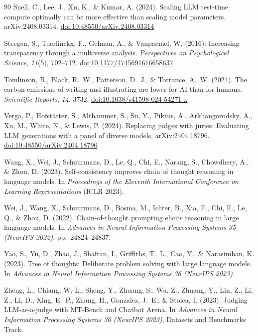\documentclass[12pt,a4paper]{article}
\begin{document}
\begin{thebibliography}{99}
Snell, C., Lee, J., Xu, K., \& Kumar, A. (2024).
Scaling LLM test-time compute optimally can be more effective than scaling model
  parameters.
arXiv:2408.03314.
\href{https://doi.org/10.48550/arXiv.2408.03314}{doi:10.48550/arXiv.2408.03314}

Steegen, S., Tuerlinckx, F., Gelman, A., \& Vanpaemel, W. (2016).
Increasing transparency through a multiverse analysis.
\textit{Perspectives on Psychological Science}, \textit{11}(5), 702--712.
\href{https://doi.org/10.1177/1745691616658637}{doi:10.1177/1745691616658637}

Tomlinson, B., Black, R.~W., Patterson, D.~J., \& Torrance, A.~W. (2024).
The carbon emissions of writing and illustrating are lower for AI than for
  humans.
\textit{Scientific Reports}, \textit{14}, 3732.
\href{https://doi.org/10.1038/s41598-024-54271-x}{doi:10.1038/s41598-024-54271-x}

Verga, P., Hofst\"atter, S., Althammer, S., Su, Y., Piktus, A.,
  Arkhangorodsky, A., Xu, M., White, N., \& Lewis, P. (2024).
Replacing judges with juries: Evaluating LLM generations with a panel of diverse
  models.
arXiv:2404.18796.
\href{https://doi.org/10.48550/arXiv.2404.18796}{doi:10.48550/arXiv.2404.18796}

Wang, X., Wei, J., Schuurmans, D., Le, Q., Chi, E., Narang, S., Chowdhery, A.,
  \& Zhou, D. (2023).
Self-consistency improves chain of thought reasoning in language models.
In \textit{Proceedings of the Eleventh International Conference on Learning
  Representations} (ICLR 2023).

Wei, J., Wang, X., Schuurmans, D., Bosma, M., Ichter, B., Xia, F., Chi, E.,
  Le, Q., \& Zhou, D. (2022).
Chain-of-thought prompting elicits reasoning in large language models.
In \textit{Advances in Neural Information Processing Systems 35 (NeurIPS 2022)},
  pp.~24824--24837.

Yao, S., Yu, D., Zhao, J., Shafran, I., Griffiths, T.~L., Cao, Y., \&
  Narasimhan, K. (2023).
Tree of thoughts: Deliberate problem solving with large language models.
In \textit{Advances in Neural Information Processing Systems 36 (NeurIPS 2023)}.

Zheng, L., Chiang, W.-L., Sheng, Y., Zhuang, S., Wu, Z., Zhuang, Y., Lin, Z.,
  Li, Z., Li, D., Xing, E.~P., Zhang, H., Gonzalez, J.~E., \& Stoica, I.
  (2023).
Judging LLM-as-a-judge with MT-Bench and Chatbot Arena.
In \textit{Advances in Neural Information Processing Systems 36 (NeurIPS 2023)},
  Datasets and Benchmarks Track.

\end{thebibliography}
\end{document}
